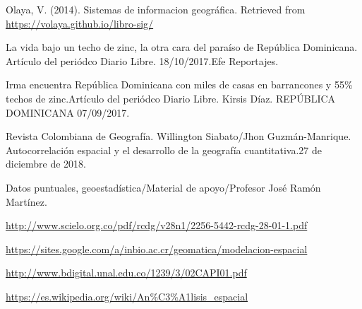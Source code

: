\documentclass[11pt,]{article}
\begin{document}
Olaya, V. (2014). Sistemas de informacion geográfica. Retrieved from
\url{https://volaya.github.io/libro-sig/}

La vida bajo un techo de zinc, la otra cara del paraíso de República
Dominicana. Artículo del periódco Diario Libre. 18/10/2017.Efe
Reportajes.

Irma encuentra República Dominicana con miles de casas en barrancones y
55\% techos de zinc.Artículo del periódco Diario Libre. Kirsis Díaz.
REPÚBLICA DOMINICANA 07/09/2017.

Revista Colombiana de Geografía. Willington Siabato/Jhon
Guzmán-Manrique. Autocorrelación espacial y el desarrollo de la
geografía cuantitativa.27 de diciembre de 2018.

Datos puntuales, geoestadística/Material de apoyo/Profesor José Ramón
Martínez.

\url{http://www.scielo.org.co/pdf/rcdg/v28n1/2256-5442-rcdg-28-01-1.pdf}

\url{https://sites.google.com/a/inbio.ac.cr/geomatica/modelacion-espacial}

\url{http://www.bdigital.unal.edu.co/1239/3/02CAPI01.pdf}

\url{https://es.wikipedia.org/wiki/An\%C3\%A1lisis_espacial}




\newpage
\singlespacing 
\end{document}
